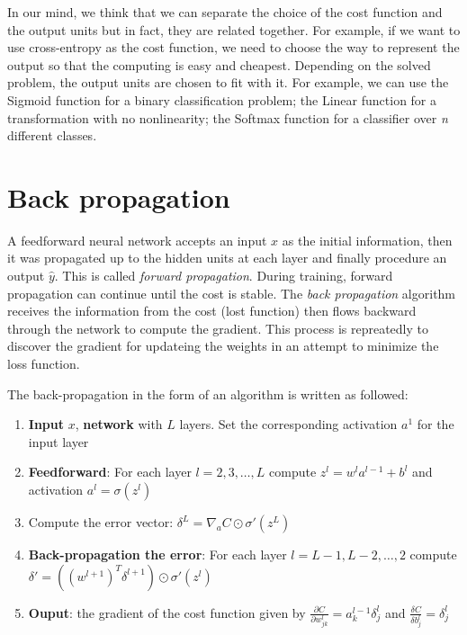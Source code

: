 In our mind, we think that we can separate the choice of the cost function and the output units but in fact, they are related together. For example, if we want to use cross-entropy as the cost function, we need to choose the way to represent the output so that the computing is easy and cheapest. Depending on the solved problem, the output units are chosen to fit with it. For example, we can use the Sigmoid function for a binary classification problem; the Linear function for a transformation with no nonlinearity; the Softmax function for a classifier over \textit{n} different classes.
\section{Back propagation}
A feedforward neural network accepts an input \textbf{$x$} as the initial information, then it was propagated up to the hidden units at each layer and finally procedure an output \textbf{$\hat{y}$}. This is called \textit{forward propagation}. During training, forward propagation can continue until the cost is stable. The \textit{back propagation} algorithm receives the information from the cost (lost function) then flows backward through the network to compute the gradient. This process is repreatedly to discover the gradient for updateing the weights in an attempt to minimize the loss function.

The back-propagation in the form of an algorithm is written as followed:
\begin{enumerate}
	\item \textbf{Input} $x$, \textbf{network} with $L$ layers. Set the corresponding activation $a^1$ for the input layer
	\item \textbf{Feedforward}: For each layer $l = 2, 3, \ldots, L $ compute $z^l = w^la^{l-1} + b^l$ and activation $a^l = \sigma(z^l)$
	\item Compute the error vector: $\delta^L = \nabla_{a}C \odot \sigma'(z^L)$
	\item \textbf{Back-propagation the error}: For each layer $l = L-1, L-2,\ldots, 2$ compute $\delta' = ((w^{l+1})^T \delta^{l+1}) \odot \sigma'(z^l)$
	\item \textbf{Ouput}: the gradient of the cost function given by $\frac{\partial C}{\partial w^l_{jk}} = a^{l-1}_k \delta^l_j$ and $\frac{\delta C}{\delta b^l_j} = \delta^l_j$
\end{enumerate}



